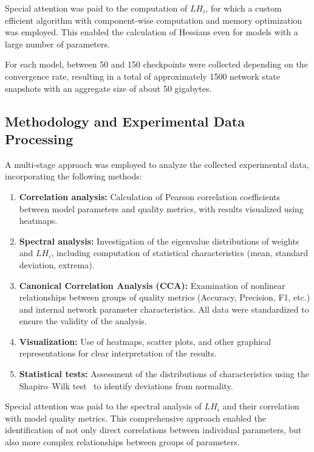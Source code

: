 \documentclass[a4paper,12pt]{article}
\begin{document}
Special attention was paid to the computation of $LH_i$, for which a custom efficient algorithm with
component-wise computation and memory optimization was employed. This enabled the calculation of Hessians
even for models with a large number of parameters.

For each model, between 50 and 150 checkpoints were collected depending on the convergence rate, resulting in
a total of approximately 1500 network state snapshots with an aggregate size of about 50 gigabytes.

\subsection{Methodology and Experimental Data Processing}

A multi-stage approach was employed to analyze the collected experimental data, incorporating the following methods:

\begin{enumerate}
  \item \textbf{Correlation analysis:} Calculation of Pearson correlation coefficients between model
    parameters and quality metrics, with results visualized using heatmaps.

  \item \textbf{Spectral analysis:} Investigation of the eigenvalue distributions of weights and $LH_i$,
    including computation of statistical characteristics (mean, standard deviation, extrema).

  \item \textbf{Canonical Correlation Analysis (CCA):} Examination of nonlinear relationships between groups
    of quality metrics (Accuracy, Precision, F1, etc.) and internal network parameter characteristics. All
    data were standardized to ensure the validity of the analysis.

  \item \textbf{Visualization:} Use of heatmaps, scatter plots, and other graphical representations for clear
    interpretation of the results.

  \item \textbf{Statistical tests:} Assessment of the distributions of characteristics using the Shapiro–Wilk
    test~\cite{shapiro1965} to identify deviations from normality.
\end{enumerate}

Special attention was paid to the spectral analysis of $LH_i$ and their correlation with model quality
metrics. This comprehensive approach enabled the identification of not only direct correlations between
individual parameters, but also more complex relationships between groups of parameters.
\end{document}
